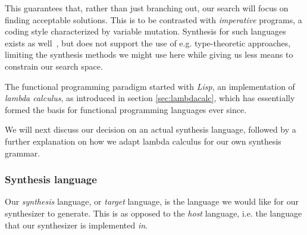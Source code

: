 \documentclass{article}
\begin{document}
This guarantees that, rather than just branching out,
our search will focus on finding acceptable solutions.
This is to be contrasted with \emph{imperative} programs,
a coding style characterized by variable mutation.
Synthesis for such languages exists as well~\citep{shi2019frangel},
but does not support the use of e.g. type-theoretic approaches,
limiting the synthesis methods we might use here
while giving us less means to constrain our search space.

The functional programming paradigm started with \emph{Lisp},
an implementation of \emph{lambda calculus},
as introduced in section \ref{sec:lambdacalc},
which has essentially formed the basis for functional programming languages ever since.

We will next discuss 
our decision on an actual synthesis language,
followed by a further explanation on how we adapt lambda calculus for our own synthesis grammar.

\subsubsection{Synthesis language}

Our \emph{synthesis} language, or \emph{target} language,
is the language we would like for our synthesizer to generate.
This is as opposed to the \emph{host} language,
i.e. the language that our synthesizer is implemented \emph{in}.
\end{document}
